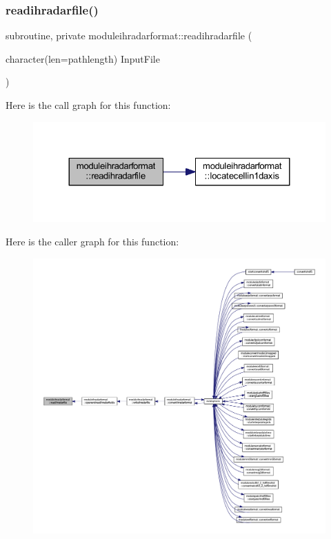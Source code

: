 \subsubsection{\texorpdfstring{readihradarfile()}{readihradarfile()}}
{\footnotesize\ttfamily subroutine, private moduleihradarformat\+::readihradarfile (\begin{DoxyParamCaption}\item[{character(len=pathlength)}]{Input\+File }\end{DoxyParamCaption})\hspace{0.3cm}{\ttfamily [private]}}

Here is the call graph for this function\+:\nopagebreak
\begin{figure}[H]
\begin{center}
\leavevmode
\includegraphics[width=324pt]{namespacemoduleihradarformat_adb71a6554853412cfc2f930bf2a31f3a_cgraph}
\end{center}
\end{figure}
Here is the caller graph for this function\+:\nopagebreak
\begin{figure}[H]
\begin{center}
\leavevmode
\includegraphics[width=350pt]{namespacemoduleihradarformat_adb71a6554853412cfc2f930bf2a31f3a_icgraph}
\end{center}
\end{figure}
\mbox{\label{namespacemoduleihradarformat_a11ef1762e3ede5825ed4cfa4192378d3}} 
